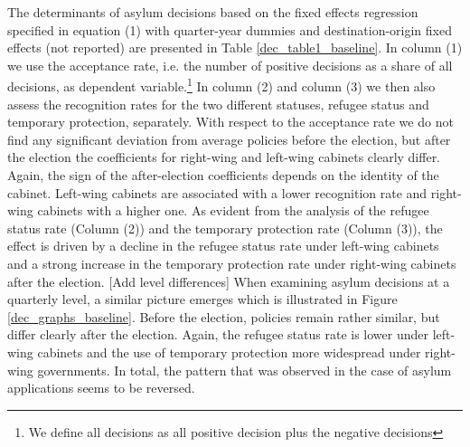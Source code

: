 \documentclass[a4paper,12pt]{article}
\begin{document}
The determinants of asylum decisions based on the fixed effects regression specified in equation (1) with quarter-year dummies and destination-origin fixed effects (not reported) are presented in Table \ref{dec_table1_baseline}. In column (1) we use the acceptance rate, i.e. the number of positive decisions as a share of all decisions, as dependent variable.\footnote{We define all decisions as all positive decision plus the negative decisions} In column (2) and column (3) we then also assess the recognition rates for the two different statuses,  refugee status and temporary protection, separately. With respect to the acceptance rate we do not find any significant deviation from average policies before the election, but after the election the coefficients for right-wing and left-wing cabinets clearly differ. Again, the sign of the after-election coefficients depends on the identity of the cabinet. Left-wing cabinets are associated with a lower recognition rate and right-wing cabinets with a higher one. As evident from the analysis of the refugee status rate (Column (2)) and the temporary protection rate (Column (3)), the effect is driven by a decline in the refugee status rate under left-wing cabinets and a strong increase in the temporary protection rate under right-wing cabinets after the election. 
[Add level differences]
 When examining asylum decisions at a quarterly level, a similar picture emerges which is illustrated in Figure \ref{dec_graphs_baseline}.  Before the election, policies remain rather similar, but differ clearly after the election. Again, the refugee status rate is lower under left-wing cabinets and the use of temporary protection more widespread under right-wing governments. In total, the pattern that was observed in the case of asylum applications seems to be reversed.
\end{document}
